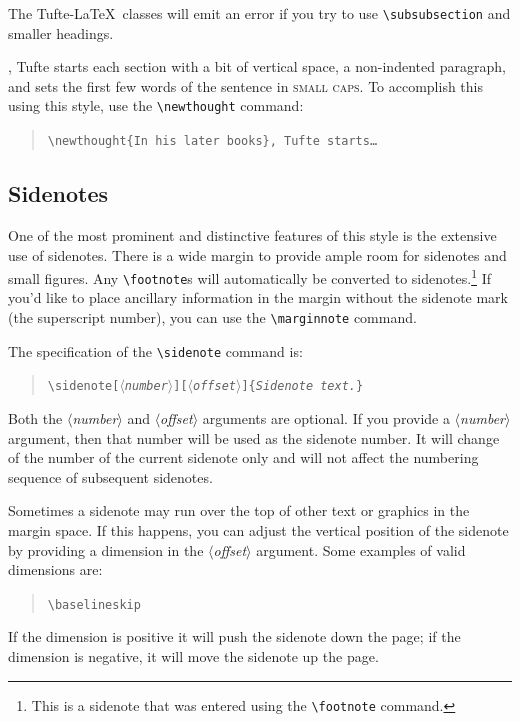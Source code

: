 \documentclass{tufte-handout}
\newcommand{\doccmd}[1]{\texttt{\textbackslash#1}}%
\newcommand{\docopt}[1]{\ensuremath{\langle}\textrm{\textit{#1}}\ensuremath{\rangle}}%
\newcommand{\docarg}[1]{\textrm{\textit{#1}}}%
\newenvironment{docspec}{\begin{quote}\noindent}{\end{quote}}%
\begin{document}
The Tufte-\LaTeX\ classes will emit an error if you try to use
\linebreak\Verb|\subsubsection| and smaller headings.

,\cite{Tufte2006} Tufte
starts each section with a bit of vertical space, a non-indented paragraph,
and sets the first few words of the sentence in \textsc{small caps}.  To
accomplish this using this style, use the \Verb|\newthought| command:
\begin{docspec}
  \doccmd{newthought\{In his later books\}, Tufte starts\ldots}
\end{docspec}

\subsection{Sidenotes}\label{sec:sidenotes}
One of the most prominent and distinctive features of this style is the
extensive use of sidenotes.  There is a wide margin to provide ample room
for sidenotes and small figures.  Any \Verb|\footnote|s will automatically
be converted to sidenotes.\footnote{This is a sidenote that was entered
  using the \texttt{\textbackslash footnote} command.}	If you'd like to place
ancillary
information in the margin without the sidenote mark (the superscript
number), you can use the \Verb|\marginnote| command.

The specification of the \Verb|\sidenote| command is:
\begin{docspec}
  \doccmd{sidenote[\docopt{number}][\docopt{offset}]\{\docarg{Sidenote
      text.}\}}
\end{docspec}

Both the \docopt{number} and \docopt{offset} arguments are optional.  If you
provide a \docopt{number} argument, then that number will be used as the
sidenote number.  It will change of the number of the current sidenote only and
will not affect the numbering sequence of subsequent sidenotes.

Sometimes a sidenote may run over the top of other text or graphics in the
margin space.  If this happens, you can adjust the vertical position of the
sidenote by providing a dimension in the \docopt{offset} argument.  Some
examples of valid dimensions are:
\begin{docspec}
  \ttfamily 1.0in \qquad 2.54cm \qquad 254mm \Verb|\baselineskip|
\end{docspec}
If the dimension is positive it will push the sidenote down the page; if the
dimension is negative, it will move the sidenote up the page.
\end{document}
